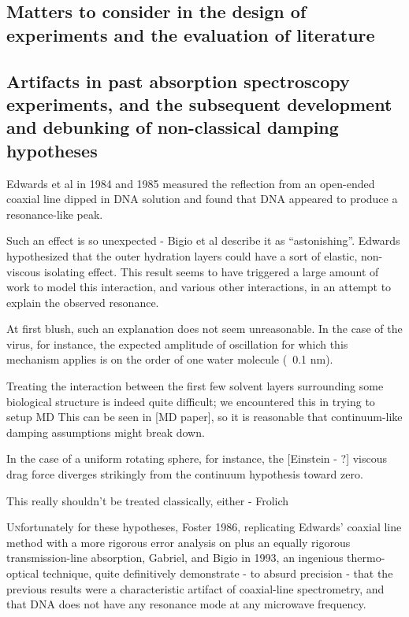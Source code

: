 \documentclass[paper.tex]{subfiles}
\begin{document}
\begin{multicols}{1}
\section{Matters to consider in the design of experiments and the evaluation of literature}

\subsection{Artifacts in past absorption spectroscopy experiments, and the subsequent development and debunking of non-classical damping hypotheses}

Edwards et al in 1984 and 1985 measured the reflection from an open-ended coaxial line dipped in DNA solution and found that DNA appeared to produce a resonance-like peak.

Such an effect is so unexpected - Bigio et al describe it as “astonishing”. Edwards hypothesized that the outer hydration layers could have a sort of elastic, non-viscous isolating effect. This result seems to have triggered a large amount of work to model this interaction, and various other interactions, in an attempt to explain the observed resonance.

At first blush, such an explanation does not seem unreasonable. In the case of the virus, for instance, the expected amplitude of oscillation for which this mechanism applies is on the order of one water molecule (~0.1 nm).

Treating the interaction between the first few solvent layers surrounding some biological structure is indeed quite difficult; we encountered this in trying to setup MD This can be seen in [MD paper], so it is reasonable that continuum-like damping assumptions might break down. 

In the case of a uniform rotating sphere, for instance, the [Einstein - ?] viscous drag force diverges strikingly from the continuum hypothesis toward zero.

This really shouldn’t be treated classically, either - Frolich 

\lettrine{U}nfortunately for these hypotheses, Foster 1986, replicating Edwards’ coaxial line method with a more rigorous error analysis on plus an equally rigorous transmission-line absorption, Gabriel, and Bigio in 1993, an ingenious thermo-optical technique, quite definitively demonstrate - to absurd precision -  that the previous results were a characteristic artifact of coaxial-line spectrometry, and that DNA does not have any resonance mode at any microwave frequency.


\end{multicols}
\end{document}
